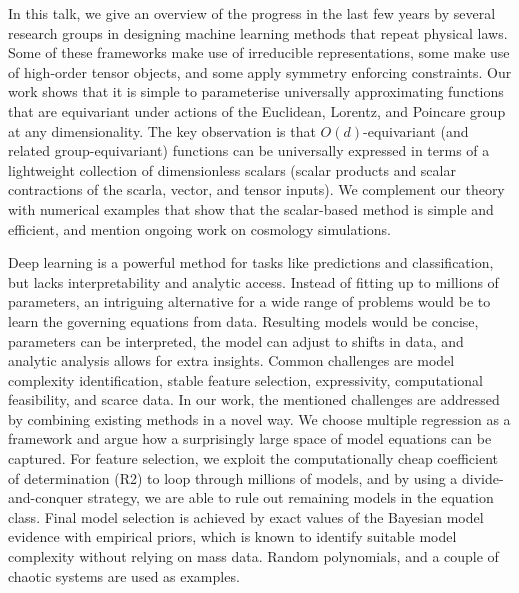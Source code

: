 \license

In this talk, we give an overview of the progress in the last few years by several research groups in designing machine learning methods that repeat physical laws. Some of these frameworks make use of irreducible representations, some make use of high-order tensor objects, and some apply symmetry enforcing constraints. Our work shows that it is simple to parameterise universally approximating functions that are equivariant under actions of the Euclidean, Lorentz, and Poincare group at any dimensionality. The key observation is that $O(d)$-equivariant (and related group-equivariant) functions can be universally expressed in terms of a lightweight collection of dimensionless scalars (scalar products and scalar contractions of the scarla, vector, and tensor inputs). We complement our theory with numerical examples that show that the scalar-based method is simple and efficient, and mention ongoing work on cosmology simulations.

\license

Deep learning is a powerful method for tasks like predictions and classification, but lacks interpretability and analytic access. Instead of fitting up to millions of parameters, an intriguing alternative for a wide range of problems would be to learn the governing equations from data. Resulting models would be concise, parameters can be interpreted, the model can adjust to shifts in data, and analytic analysis allows for extra insights. Common challenges are model complexity identification, stable feature selection, expressivity, computational feasibility, and scarce data. In our work, the mentioned challenges are addressed by combining existing methods in a novel way. We choose multiple regression as a framework and argue how a surprisingly large space of model equations can be captured. For feature selection, we exploit the computationally cheap coefficient of determination (R2) to loop through millions of models, and by using a divide-and-conquer strategy, we are able to rule out remaining models in the equation class. Final model selection is achieved by exact values of the Bayesian model evidence with empirical priors, which is known to identify suitable model complexity without relying on mass data. Random polynomials, and a couple of chaotic systems are used as examples.
